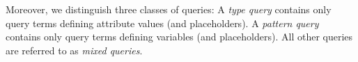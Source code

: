 

Moreover, we distinguish three classes of queries: A
\emph{type query} contains only query terms defining
attribute values (and
placeholders). A \emph{pattern query} contains only query
terms defining variables (and
placeholders). All other queries are referred to as
\emph{mixed queries}.


